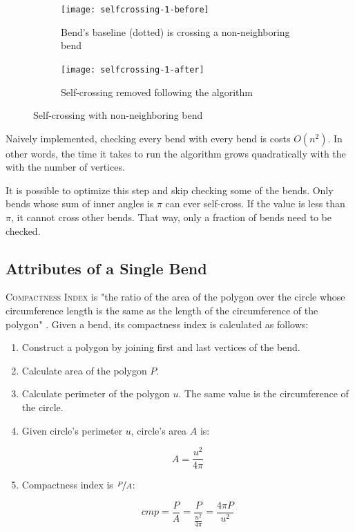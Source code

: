 \documentclass[a4paper]{article}
\begin{document}
\begin{figure}[h]
    \centering
    \begin{subfigure}[b]{.49\textwidth}
        \texttt{[image: selfcrossing-1-before]}
        \caption{Bend's baseline (dotted) is crossing a non-neighboring bend}
    \end{subfigure}
    \hfill
    \begin{subfigure}[b]{.49\textwidth}
        \texttt{[image: selfcrossing-1-after]}
        \caption{Self-crossing removed following the algorithm}
    \end{subfigure}
    \caption{Self-crossing with non-neighboring bend}
    \label{fig:selfcrossing-1-non-neighbor}
\end{figure}

Naively implemented, checking every bend with every bend is costs $O(n^2)$. In
other words, the time it takes to run the algorithm grows quadratically with
the with the number of vertices.

It is possible to optimize this step and skip checking some of the bends. Only
bends whose sum of inner angles is $\pi$ can ever self-cross. If the value is
less than $\pi$, it cannot cross other bends. That way, only a fraction of
bends need to be checked.

\subsection{Attributes of a Single Bend}



\textsc{Compactness Index} is "the ratio of the area of the polygon over the
circle whose circumference length is the same as the length of the
circumference of the polygon" \cite{wang1998line}. Given a bend, its
compactness index is calculated as follows:

\begin{enumerate}

  \item Construct a polygon by joining first and last vertices of the bend.

  \item Calculate area of the polygon $P$.

  \item Calculate perimeter of the polygon $u$. The same value is the
    circumference of the circle.

  \item Given circle's perimeter $u$, circle's area $A$ is:

    \[
      A = \frac{u^2}{4\pi}
    \]

  \item Compactness index is $\nicefrac{P}{A}$:

    \[
      cmp = \frac{P}{A} = \frac{P}{ \frac{u^2}{4\pi} } = \frac{4\pi P}{u^2}
    \]

\end{enumerate}
\end{document}
